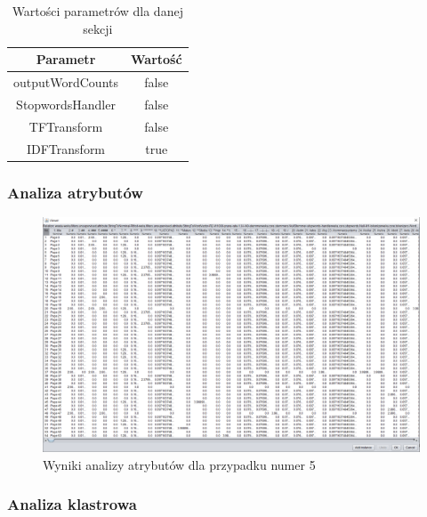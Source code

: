 \documentclass[../EDI_Task2_Karwowski_Kowalewski.tex]{subfiles}
\begin{document}
{{        \begin{table}[!htbp]
            \small
            \centering
            \begin{tabular}{|c|c|}
                \hline
                Parametr & Wartość \\ \hline
                outputWordCounts & false \\ \hline
                StopwordsHandler & false \\ \hline
                TFTransform & false \\ \hline
                IDFTransform & true \\ \hline
            \end{tabular}
            \caption{Wartości parametrów dla danej sekcji}
        \end{table}
        \FloatBarrier

        \subsubsection{Analiza atrybutów} {

            \begin{figure}[!htbp]
                \centering
                \includegraphics[width=\textwidth]{img/results2/weeia-case5.png}
                \caption{Wyniki analizy atrybutów dla przypadku numer 5}
            \end{figure}
            \FloatBarrier
        }

        \subsubsection{Analiza klastrowa} {

}}}
\end{document}
